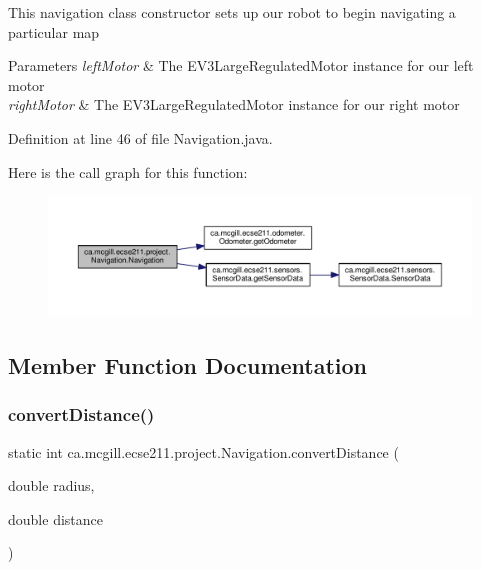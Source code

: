 This navigation class constructor sets up our robot to begin navigating a particular map


\begin{DoxyParams}{Parameters}
{\em left\+Motor} & The E\+V3\+Large\+Regulated\+Motor instance for our left motor \\
\hline
{\em right\+Motor} & The E\+V3\+Large\+Regulated\+Motor instance for our right motor \\
\hline
\end{DoxyParams}


Definition at line 46 of file Navigation.\+java.

Here is the call graph for this function\+:
\nopagebreak
\begin{figure}[H]
\begin{center}
\leavevmode
\includegraphics[width=350pt]{classca_1_1mcgill_1_1ecse211_1_1project_1_1_navigation_aaee14b67c392ddd951e3ce21224c3e56_cgraph}
\end{center}
\end{figure}


\subsection{Member Function Documentation}
\mbox{\label{classca_1_1mcgill_1_1ecse211_1_1project_1_1_navigation_ac9e260bcd619ffa4820d7d0de7ea1c12}} 
\subsubsection{\texorpdfstring{convert\+Distance()}{convertDistance()}}
{\footnotesize\ttfamily static int ca.\+mcgill.\+ecse211.\+project.\+Navigation.\+convert\+Distance (\begin{DoxyParamCaption}\item[{double}]{radius,  }\item[{double}]{distance }\end{DoxyParamCaption})\hspace{0.3cm}{\ttfamily [static]}}

